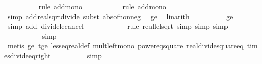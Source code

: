 \begin{isabellebody}
\ \ \ \ \ \ \ \ \isamarkupfalse%
\ {\isacharparenleft}{\kern0pt}rule\ add{\isacharunderscore}{\kern0pt}mono{\isacharparenright}{\kern0pt}\isanewline
\ \ \ \ \ \ \ \ \ \isamarkupfalse%
\ {\isacharparenleft}{\kern0pt}rule\ add{\isacharunderscore}{\kern0pt}mono{\isacharparenright}{\kern0pt}\isanewline
\ \ \ \ \ \ \ \ \ \ \isamarkupfalse%
\ {\isacharparenleft}{\kern0pt}simp\ add{\isacharcolon}{\kern0pt}real{\isacharunderscore}{\kern0pt}sqrt{\isacharunderscore}{\kern0pt}divide{\isacharcomma}{\kern0pt}\ subst\ abs{\isacharunderscore}{\kern0pt}of{\isacharunderscore}{\kern0pt}nonneg{\isacharparenright}{\kern0pt}\ \isamarkupfalse%
\ {\isasymdelta}{\isacharprime}{\kern0pt}{\isacharunderscore}{\kern0pt}ge{\isacharunderscore}{\kern0pt}{}\ \isamarkupfalse%
\ linarith\isanewline
\ \ \ \ \ \ \ \ \isamarkupfalse%
\ {\isasymdelta}{\isacharprime}{\kern0pt}{\isacharunderscore}{\kern0pt}ge{\isacharunderscore}{\kern0pt}{}\ \isamarkupfalse%
\ {\isacharparenleft}{\kern0pt}simp\ add{\isacharcolon}{\kern0pt}\ divide{\isacharunderscore}{\kern0pt}le{\isacharunderscore}{\kern0pt}cancel{\isacharparenright}{\kern0pt}\isanewline
\ \ \ \ \ \ \ \ \ \ \isamarkupfalse%
\ {\isacharparenleft}{\kern0pt}rule\ real{\isacharunderscore}{\kern0pt}le{\isacharunderscore}{\kern0pt}lsqrt{\isacharcomma}{\kern0pt}\ simp{\isacharcomma}{\kern0pt}\ simp{\isacharcomma}{\kern0pt}\ simp{\isacharparenright}{\kern0pt}\isanewline
\ \ \ \ \ \ \ \ \ \isamarkupfalse%
\ simp\isanewline
\ \ \ \ \ \ \ \ \ \isamarkupfalse%
\ {\isacharparenleft}{\kern0pt}metis\ {\isasymdelta}{\isacharprime}{\kern0pt}{\isacharunderscore}{\kern0pt}ge{\isacharunderscore}{\kern0pt}{}\ t{\isacharunderscore}{\kern0pt}ge{\isacharunderscore}{\kern0pt}{\isasymdelta}{\isacharprime}{\kern0pt}\ less{\isacharunderscore}{\kern0pt}eq{\isacharunderscore}{\kern0pt}real{\isacharunderscore}{\kern0pt}def\ mult{\isacharunderscore}{\kern0pt}left{\isacharunderscore}{\kern0pt}mono\ power{}{\isacharunderscore}{\kern0pt}eq{\isacharunderscore}{\kern0pt}square\ real{\isacharunderscore}{\kern0pt}divide{\isacharunderscore}{\kern0pt}square{\isacharunderscore}{\kern0pt}eq\ times{\isacharunderscore}{\kern0pt}divide{\isacharunderscore}{\kern0pt}eq{\isacharunderscore}{\kern0pt}right{\isacharparenright}{\kern0pt}\isanewline
\ \ \ \ \ \ \ \ \isamarkupfalse%
\ simp\isanewline
\ \ \ \ \ \ \isamarkupfalse%
\ \isamarkupfalse%

\end{isabellebody}
